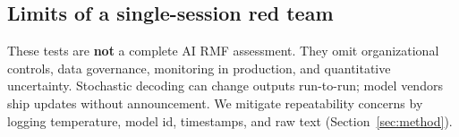 \subsection{Limits of a single-session red team}
These tests are \textbf{not} a complete AI RMF assessment. They omit organizational controls, data governance, monitoring in production, and quantitative uncertainty. Stochastic decoding can change outputs run-to-run; model vendors ship updates without announcement. We mitigate repeatability concerns by logging temperature, model id, timestamps, and raw text (Section~\ref{sec:method}).
